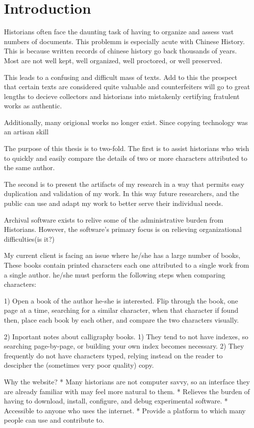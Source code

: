 \chapter{Introduction}

Historians often face the daunting task of having to organize and assess vast numbers of documents.  This problemm is especially acute with Chinese History.  This is because written records of chinese history go back thousands of years.  Most are not well kept, well organized, well proctored, or well preserved.

This leads to a confusing and difficult mass of texts.  Add to this the prospect that certain texts are considered quite valuable and counterfeiters will go to great lengths to decieve collectors and historians into mistakenly certifying fratulent works as authentic.

Additionally, many origional works no longer exist.  Since copying technology was an artisan skill 


The purpose of this thesis is to two-fold.  The first is to assist historians who wish to quickly and easily compare the details of two or more characters attributed to the same author.

The second is to present the artifacts of my research in a way that permits easy duplication and validation of my work.  In this way future researchers, and the public can use and adapt my work to better serve their individual needs.

Archival software exists to relive some of the administrative burden from Historians.  However, the software's primary focus is on relieving organizational difficulties(is it?)  

My current client is facing an issue where he/she has a large number of books,  These books contain printed characters each one attributed to a single work from a single author.  he/she must perform the following steps when comparing characters:

1)  Open a book of the author he-she is interested.  Flip through the book, one page at a time, searching for a similar character, when that character if found then, place each book by each other, and compare the two characters visually.

2) Inportant notes about calligraphy books.  1)  They tend to not have indexes, so searching page-by-page, or building your own index becomes necessary.  2)  They frequently do not have characters typed, relying instead on the reader to descipher the (sometimes very poor quality) copy.

    
Why the website?
    * Many historians are not computer savvy, so an interface they are already familiar with may feel more natural to them.
    * Relieves the burden of having to download, install, configure, and debug experimental software.
    * Accessible to anyone who uses the internet.
    * Provide  a platform to which many people can use and contribute to.

